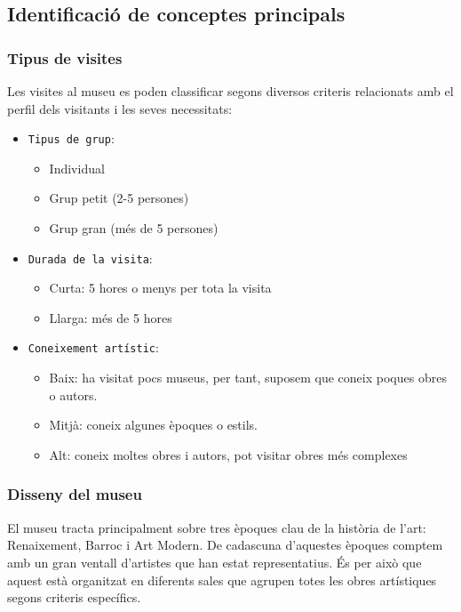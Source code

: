 \documentclass[a4paper]{article}
\begin{document}
	
	\subsection{Identificació de conceptes principals}
	
	\subsubsection{Tipus de visites}
	Les visites al museu es poden classificar segons diversos criteris relacionats amb el perfil dels visitants i les seves necessitats:
	\begin{itemize}
		\item \texttt{Tipus de grup}:
		\begin{itemize}
			\item Individual
			\item Grup petit (2-5 persones)
			\item Grup gran (més de 5 persones)
		\end{itemize}
		\item \texttt{Durada de la visita}:
		\begin{itemize}
			\item Curta: 5 hores o menys per tota la visita
			\item Llarga: més de 5 hores
		\end{itemize}
		\item \texttt{Coneixement artístic}:
		\begin{itemize}
			\item Baix: ha visitat pocs museus, per tant, suposem que coneix poques obres o autors.
			\item Mitjà: coneix algunes èpoques o estils.
			\item Alt: coneix moltes obres i autors, pot visitar obres més complexes
		\end{itemize}
	\end{itemize}
	
	\subsubsection{Disseny del museu}
	El museu tracta principalment sobre tres èpoques clau de la història de l'art: {Renaixement, Barroc i Art Modern}. De cadascuna d'aquestes èpoques comptem amb un gran ventall d'artistes que han estat representatius. És per això que aquest està organitzat en diferents sales que agrupen totes les obres artístiques segons criteris específics.
	
\end{document}

